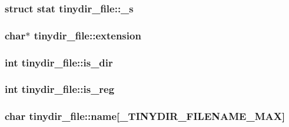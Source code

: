 \subsubsection[{\+\_\+s}]{\setlength{\rightskip}{0pt plus 5cm}struct stat tinydir\+\_\+file\+::\+\_\+s}\label{structtinydir__file_a71140206c03eb005035143ec3032a712}
\hypertarget{structtinydir__file_a0e760decbe09e679a4637d7d0630bf68}{}
\subsubsection[{extension}]{\setlength{\rightskip}{0pt plus 5cm}char$\ast$ tinydir\+\_\+file\+::extension}\label{structtinydir__file_a0e760decbe09e679a4637d7d0630bf68}
\hypertarget{structtinydir__file_a702617c7ea4fad8a0ebde539eec9e5a7}{}
\subsubsection[{is\+\_\+dir}]{\setlength{\rightskip}{0pt plus 5cm}int tinydir\+\_\+file\+::is\+\_\+dir}\label{structtinydir__file_a702617c7ea4fad8a0ebde539eec9e5a7}
\hypertarget{structtinydir__file_a5d54c59718ccf7ada9fba3aec8c109bf}{}
\subsubsection[{is\+\_\+reg}]{\setlength{\rightskip}{0pt plus 5cm}int tinydir\+\_\+file\+::is\+\_\+reg}\label{structtinydir__file_a5d54c59718ccf7ada9fba3aec8c109bf}
\hypertarget{structtinydir__file_af08987f1603e1cb849d34985ff2d1507}{}
\subsubsection[{name}]{\setlength{\rightskip}{0pt plus 5cm}char tinydir\+\_\+file\+::name\mbox{[}{\bf \+\_\+\+T\+I\+N\+Y\+D\+I\+R\+\_\+\+F\+I\+L\+E\+N\+A\+M\+E\+\_\+\+M\+A\+X}\mbox{]}}\label{structtinydir__file_af08987f1603e1cb849d34985ff2d1507}
\hypertarget{structtinydir__file_a84d716ed154fb4af871866856af95bdb}{}
